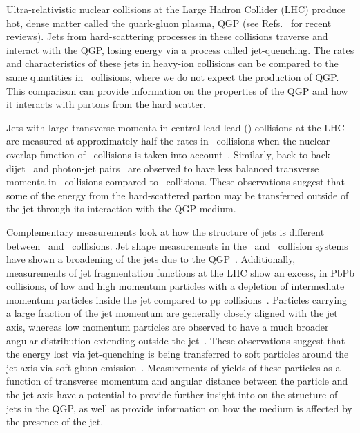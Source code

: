 
Ultra-relativistic nuclear collisions at the Large Hadron Collider (LHC) produce hot, dense matter called the quark-gluon plasma, QGP (see Refs.~\cite{Roland:2014jsa,Busza:2018rrf} for recent reviews).
Jets from hard-scattering processes in these collisions traverse and interact with the QGP, losing energy via a process called jet-quenching.
The rates and characteristics of these jets in heavy-ion collisions can be compared to the same quantities in \pp\ collisions, where we do not expect the production of QGP.
This comparison can provide information on the properties of the QGP and how it interacts with partons from the hard scatter.

Jets with large transverse momenta in central lead-lead (\pbpb) collisions at the LHC are measured at approximately half the rates in \pp\ collisions when the nuclear overlap function of \pbpb\ collisions is taken into account~\cite{Abelev:2013kqa,Aad:2014bxa,Adam:2015ewa,Khachatryan:2016jfl, 2019108}.
Similarly, back-to-back dijet~\cite{Aad:2010bu,Chatrchyan:2011sx,Aaboud:2017eww} and photon-jet pairs~\cite{Chatrchyan:2012gt,Aaboud:2018anc} are observed to have less balanced transverse momenta in \pbpb\ collisions compared to \pp\ collisions.
These observations suggest that some of the energy from the hard-scattered parton may be transferred outside of the jet through its interaction with the QGP medium.
 
Complementary measurements look at how the structure of jets is different between \pbpb\ and \pp\ collisions.
Jet shape measurements in the \pp\ and \pbpb\ collision systems have shown a broadening of the jets due to the QGP~\cite{Aad:2011sc, Acharya:2018uvf, Chatrchyan:2012mec, Chatrchyan:2013kwa}.
Additionally, measurements of jet fragmentation functions at the LHC show an excess, in PbPb collisions, of low and high momentum particles with a depletion of intermediate momentum particles inside the jet compared to pp collisions~\cite{Aad:2014wha,Chatrchyan:2014ava,Aaboud:2017bzv,Aaboud:2018hpb}.
Particles carrying a large fraction of the jet momentum are generally closely aligned with the jet axis, whereas low momentum particles are observed to have a much broader angular distribution extending outside the jet~\cite{Chatrchyan:2011sx,Khachatryan:2015lha,Khachatryan:2016tfj,Sirunyan:2018jqr}.
These observations suggest that the energy lost via jet-quenching is being transferred to soft particles around the jet axis via soft gluon emission~\cite{Vitev:2008rz,Ovanesyan:2011xy,Blaizot:2014ula,Qin:2015srf,Escobedo:2016jbm,Casalderrey-Solana:2016jvj,Tachibana:2017syd}.
Measurements of yields of these particles as a function of transverse momentum and angular distance between the particle and the jet axis have a potential to provide further insight into on the structure of jets in the QGP, as well as provide information on how the medium is affected by the presence of the jet.


